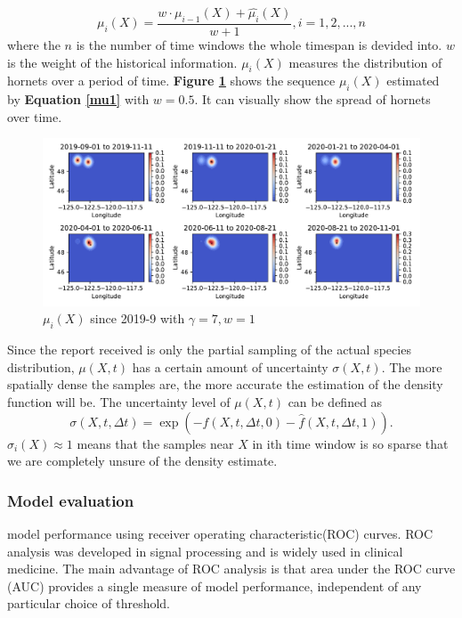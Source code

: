 \documentclass[12pt]{article}
\begin{document}
\begin{equation}
	\mu_i(X) =\frac{w \cdot \mu_{i-1}(X) +  \hat{\mu_i}(X)}{w+1} , i=1,2,...,n
	\label{nu_update}
\end{equation}
where the $n$ is the number of time windows the whole timespan is devided into. $w$ is the weight of the historical information.
$\mu_i(X)$ measures the distribution of hornets over a period of time. \textbf{Figure \ref{species_spread_svm_10}} shows the sequence $\mu_i(X)$ estimated by \textbf{Equation \ref{mu1}} with $w=0.5$. It can visually show the spread of hornets over time.

\begin{figure}[H]%
	\small
	\centering
	\includegraphics[width=17cm]{./pictures/species_spread_svm_10}
	\caption{$\mu_i(X)$ since 2019-9 with $\gamma=7, w=1$}\label{species_spread_svm_10}
\end{figure}


Since the report received is only the partial sampling of the actual species distribution, $\mu(X, t)$ has  a certain amount of uncertainty $\sigma(X, t)$. The more spatially dense the samples are, the more accurate the estimation of the density function will be. The uncertainty level of $\mu(X, t)$ can be defined as 
\begin{equation}
	\sigma(X, t, \Delta t) = \exp (-\hat{{f}}(X, t, \Delta t, 0)-\hat{{f}}(X, t, \Delta t, 1)).
	\label{uncertainty}
\end{equation}
$\sigma_i(X) \approx 1$ means that the samples near $X$ in ith time window is so sparse that we are completely unsure of the density estimate.

\subsubsection{Model evaluation}
model performance using receiver operating characteristic(ROC) curves. ROC analysis was developed in signal processing and is widely used in clinical medicine\cite{roc}. The main advantage of ROC analysis is that area under the ROC curve (AUC) provides a single measure of model performance, independent of any particular choice of threshold.\cite{2} 
\end{document}
